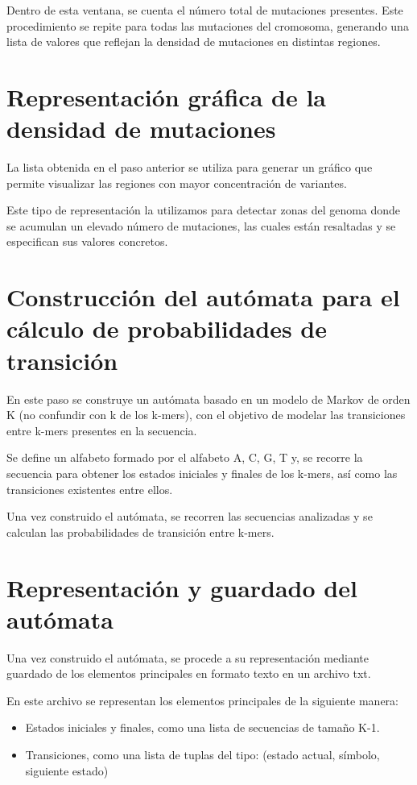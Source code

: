 \documentclass[11pt,spanish,listoffigures,listoftables]{tfgetsinf}
\begin{document}
Dentro de esta ventana, se cuenta el número total de mutaciones presentes. Este procedimiento se repite para todas las mutaciones del cromosoma, generando una lista de valores que reflejan la densidad de mutaciones en distintas regiones.

\section{Representación gráfica de la densidad de mutaciones}

La lista obtenida en el paso anterior se utiliza para generar un gráfico que permite visualizar las regiones con mayor concentración de variantes.

Este tipo de representación la utilizamos para detectar zonas del genoma donde se acumulan un elevado número de mutaciones, las cuales están resaltadas y se especifican sus valores concretos.

\section{Construcción del autómata para el cálculo de probabilidades de transición}

En este paso se construye un autómata basado en un modelo de Markov de orden K (no confundir con k de los k-mers), con el objetivo de modelar las transiciones entre k-mers presentes en la secuencia.

Se define un alfabeto formado por el alfabeto {A, C, G, T} y, se recorre la secuencia para obtener los estados iniciales y finales de los k-mers, así como las transiciones existentes entre ellos.

Una vez construido el autómata, se recorren las secuencias analizadas y se calculan las probabilidades de transición entre k-mers.

\section{Representación y guardado del autómata}

Una vez construido el autómata, se procede a su representación mediante guardado de los elementos principales en formato texto en un archivo txt.

En este archivo se representan los elementos principales de la siguiente manera:

\begin{itemize}
   \item Estados iniciales y finales, como una lista de secuencias de tamaño K-1.
   \item Transiciones, como una lista de tuplas del tipo: (estado actual, símbolo, siguiente estado)
\end{itemize}
\end{document}
